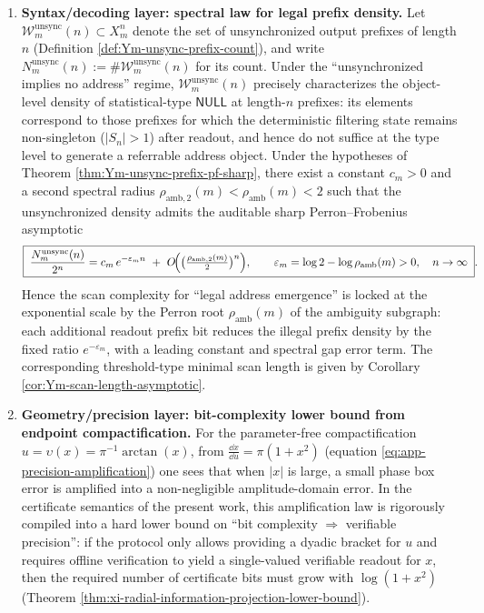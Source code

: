 \begin{enumerate}
  \item \textbf{Syntax/decoding layer: spectral law for legal prefix density.}
  Let \(\mathcal{W}_{m}^{\mathrm{unsync}}(n)\subset X_m^n\) denote the set of unsynchronized output prefixes of length \(n\) (Definition \ref{def:Ym-unsync-prefix-count}), and write \(N_m^{\mathrm{unsync}}(n):=\#\mathcal{W}_{m}^{\mathrm{unsync}}(n)\) for its count.
  Under the ``unsynchronized implies no address'' regime, \(\mathcal{W}_{m}^{\mathrm{unsync}}(n)\) precisely characterizes the object-level density of statistical-type \(\mathsf{NULL}\) at length-\(n\) prefixes: its elements correspond to those prefixes for which the deterministic filtering state remains non-singleton (\(|S_n|>1\)) after readout, and hence do not suffice at the type level to generate a referrable address object.
  Under the hypotheses of Theorem \ref{thm:Ym-unsync-prefix-pf-sharp}, there exist a constant \(c_m>0\) and a second spectral radius \(\rho_{\mathrm{amb},2}(m)<\rho_{\mathrm{amb}}(m)<2\) such that the unsynchronized density admits the auditable sharp Perron--Frobenius asymptotic
  \begin{equation}\label{eq:xi-unsync-prefix-density-pf-law}
  \boxed{\;
  \frac{N_m^{\mathrm{unsync}}(n)}{2^n}
  =c_m\,e^{-\varepsilon_m n}\ +\ O\!\Bigl(\bigl(\tfrac{\rho_{\mathrm{amb},2}(m)}{2}\bigr)^n\Bigr),
  \qquad
  \varepsilon_m=\log 2-\log\rho_{\mathrm{amb}}(m)>0,\quad n\to\infty\; }.
  \end{equation}
  Hence the scan complexity for ``legal address emergence'' is locked at the exponential scale by the Perron root \(\rho_{\mathrm{amb}}(m)\) of the ambiguity subgraph: each additional readout prefix bit reduces the illegal prefix density by the fixed ratio \(e^{-\varepsilon_m}\), with a leading constant and spectral gap error term.
  The corresponding threshold-type minimal scan length is given by Corollary \ref{cor:Ym-scan-length-asymptotic}.
  \item \textbf{Geometry/precision layer: bit-complexity lower bound from endpoint compactification.}
  For the parameter-free compactification \(u=\upsilon(x)=\pi^{-1}\arctan(x)\), from \(\frac{\dd x}{\dd u}=\pi(1+x^2)\) (equation \eqref{eq:app-precision-amplification}) one sees that when \(|x|\) is large, a small phase box error is amplified into a non-negligible amplitude-domain error.
  In the certificate semantics of the present work, this amplification law is rigorously compiled into a hard lower bound on ``bit complexity \(\Rightarrow\) verifiable precision'': if the protocol only allows providing a dyadic bracket for \(u\) and requires offline verification to yield a single-valued verifiable readout for \(x\), then the required number of certificate bits must grow with \(\log(1+x^2)\) (Theorem \ref{thm:xi-radial-information-projection-lower-bound}).
\end{enumerate}

